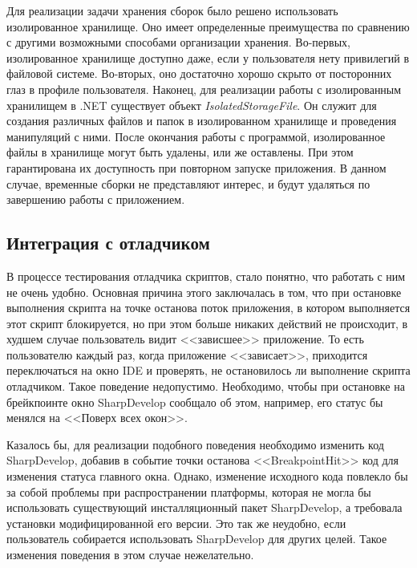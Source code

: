 Для реализации задачи хранения сборок было решено использовать изолированное хранилище. Оно имеет определенные преимущества по сравнению с другими возможными способами организации хранения. Во-первых, изолированное хранилище доступно даже, если у пользователя нету привилегий в файловой системе. Во-вторых, оно достаточно хорошо скрыто от посторонних глаз в профиле пользователя. Наконец, для реализации работы с изолированным хранилищем в .NET существует объект {\it IsolatedStorageFile}. Он служит для создания различных файлов и папок в изолированном хранилище и проведения манипуляций с ними. После окончания работы с программой, изолированное файлы в хранилище могут быть удалены, или же оставлены. При этом гарантирована их доступность при повторном запуске приложения. В данном случае, временные сборки не представляют интерес, и будут удаляться по завершению работы с приложением.

 
\subsection{Интеграция с отладчиком}
\label{sec:sd_debug}

В процессе тестирования отладчика скриптов, стало понятно, что работать с ним не очень удобно. Основная причина этого заключалась в том, что при остановке выполнения скрипта на точке останова поток приложения, в котором выполняется этот скрипт блокируется, но при этом больше никаких действий не происходит, в худшем случае пользователь видит <<зависшее>> приложение. То есть пользователю каждый раз, когда приложение <<зависает>>, приходится переключаться на окно IDE и проверять, не остановилось ли выполнение скрипта отладчиком. Такое поведение недопустимо. Необходимо, чтобы при остановке на брейкпоинте окно SharpDevelop сообщало об этом, например, его статус бы менялся на <<Поверх всех окон>>.

Казалось бы, для реализации подобного поведения необходимо изменить код SharpDevelop, добавив в событие точки останова <<BreakpointHit>> код для изменения статуса главного окна. Однако, изменение исходного кода повлекло бы за собой проблемы при распространении платформы, которая не могла бы использовать существующий инсталляционный пакет SharpDevelop, а требовала установки модифицированной его версии. Это так же неудобно, если пользователь собирается использовать SharpDevelop для других целей. Такое изменения поведения в этом случае нежелательно.

